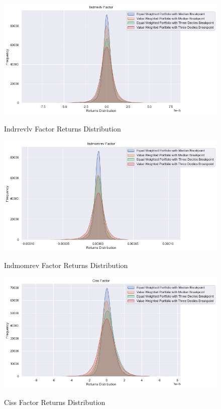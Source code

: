 \begin{figure}[H]
	\caption{Indrrevlv Factor Returns Distribution}
	\centering
	\includegraphics[scale=.63]{../../output/figures/indrrevlv.png}
	\label{fig:indrrevlv}
\end{figure}

\begin{figure}[H]
	\caption{Indmomrev Factor Returns Distribution}
	\centering
	\includegraphics[scale=.63]{../../output/figures/indmomrev.png}
	\label{fig:indmomrev}
\end{figure}

\begin{figure}[H]
	\caption{Ciss Factor Returns Distribution}
	\centering
	\includegraphics[scale=.63]{../../output/figures/ciss.png}
	\label{fig:ciss}
\end{figure}

